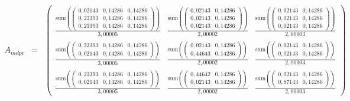 \begin{align*}
	A_{mdpc} & = &
	\begin{pmatrix}
		\frac{\text{sum}(\begin{pmatrix}
			0,02143 & 0,14286 & 0,14286 \\
			0,23393 & 0,14286 & 0,14286 \\
			0,23393 & 0,14286 & 0,14286
		\end{pmatrix})}{3,00005} &
		\frac{\text{sum}(\begin{pmatrix}
			0,02143 & 0,14286 \\
			0,02143 & 0,14286 \\
			0,02143 & 0,14286
		\end{pmatrix})}{2,00002} &
		\frac{\text{sum}(\begin{pmatrix}
			0,02143 & 0,14286 \\
			0,02143 & 0,14286 \\
			0,02143 & 0,14286
		\end{pmatrix})}{2,00003} \\
		\frac{\text{sum}(\begin{pmatrix}
			0,23393 & 0,14286 & 0,14286 \\
			0,02143 & 0,14286 & 0,14286
		\end{pmatrix})}{3,00005} &
		\frac{\text{sum}(\begin{pmatrix}
			0,02143 & 0,14286 \\
			0,44643 & 0,14286
		\end{pmatrix})}{2,00002} &
		\frac{\text{sum}(\begin{pmatrix}
			0,02143 & 0,14286 \\
			0,02143 & 0,14286
		\end{pmatrix})}{2,00003} \\
		\frac{\text{sum}(\begin{pmatrix}
			0,23393 & 0,14286 & 0,14286 \\
			0,02143 & 0,14286 & 0,14286
		\end{pmatrix})}{3,00005} &
		\frac{\text{sum}(\begin{pmatrix}
			0,44642 & 0,14286 \\
			0,02143 & 0,14286
		\end{pmatrix})}{2,00002} &
		\frac{\text{sum}(\begin{pmatrix}
			0,02143 & 0,14286 \\
			0,87143 & 0,14286
		\end{pmatrix})}{2,00003}
	\end{pmatrix} \\

\end{align*}
